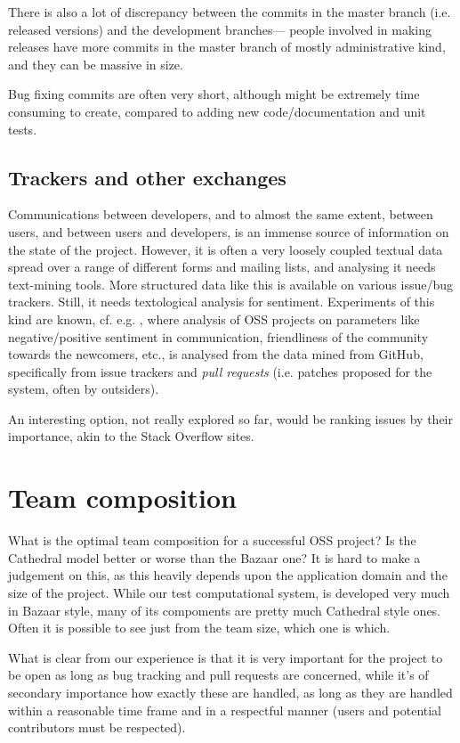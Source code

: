 \documentclass{deliverablereport}
\begin{document}
There is also a lot of discrepancy between the commits in the
master branch (i.e. released versions) and the development branches---
people involved in making releases have more commits in the master
branch of mostly administrative kind, and they can be massive in size.

Bug fixing commits are often very short, although might be extremely
time consuming to create, compared to adding new code/documentation
and unit tests.


\subsection{Trackers and other exchanges}\label{wp7:sect:sentana}
Communications between developers, and to almost the same extent,
between users, and between users and developers, is an immense
source of information on the state of the project.
However, it is often a very loosely coupled textual data spread
over a range of different forms and mailing lists, and analysing it
needs text-mining tools. More structured data like this is available
on various issue/bug trackers. Still, it needs textological analysis for
sentiment. Experiments of this kind are known, cf. e.g.
\cite{wp7:fossheartbeat}, where analysis of OSS projects on parameters
like negative/positive sentiment in communication, friendliness of the
community towards the newcomers, etc., is analysed from the data
mined from GitHub, specifically from issue trackers and 
{\em pull requests} (i.e. patches proposed for the system, often by outsiders).

An interesting option, not really explored so far, would be 
ranking issues by their importance, akin to the Stack Overflow
\cite{wp7:stackoverflow} sites.

\section{Team composition}
What is the optimal team composition for a successful OSS project?
Is the Cathedral model \cite{raymond99:cathedral-bazaar}
better or worse than the Bazaar one? It is hard to make a judgement on this,
as this heavily depends upon the application domain and the
size of the project. While our test computational system, \Sage
is developed very much in Bazaar style, many of its compoments
are pretty much Cathedral style ones.
Often it is possible to see just from the team size, which one is which.

What is clear from our experience is that it is very important
for the project to be open as long as bug tracking and pull requests
are concerned, while it's of secondary importance how exactly these are handled,
as long as they are handled within a reasonable time frame and in 
a respectful manner (users and potential contributors must be
respected).
\end{document}
